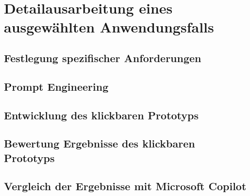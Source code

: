 \chapter{Detailausarbeitung eines ausgewählten Anwendungsfalls}

\section{Festlegung spezifischer Anforderungen}

\section{Prompt Engineering}

\section{Entwicklung des klickbaren Prototyps}

\section{Bewertung Ergebnisse des klickbaren Prototyps}

\section{Vergleich der Ergebnisse mit Microsoft Copilot}